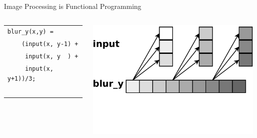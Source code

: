 \documentclass[xcolor=dvipsnames]{beamer}
\begin{document}
\begin{frame}{Image Processing is Functional Programming}
	\begin{columns}

	\begin{tabular}{l}
		\texttt{blur\_y(x,y) =} \\
		\texttt{~~~~(input(x, y-1) +}\\
		\texttt{~~~~~input(x, y~~) +}\\
		\texttt{~~~~~input(x, y+1))/3;}\\
		\\
		\\
		\\
		\\
		\\
	\end{tabular}

	\includegraphics[width=\textwidth]{blury.pdf}
	\end{columns}
\end{frame}
\end{document}
